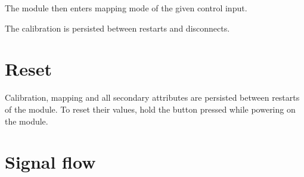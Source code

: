 \documentclass[11pt]{article}
\begin{document}
\begin{minipage}[t]{0.45\textwidth}
The module then enters mapping mode of the given control input.

The calibration is persisted between restarts and disconnects.

\vspace{1.3cm}

\section{Reset}

Calibration, mapping and all secondary attributes are persisted between restarts
of the module. To reset their values, hold the button pressed while powering on
the module.

\end{minipage}

\newpage

\section{Signal flow}
\end{document}
